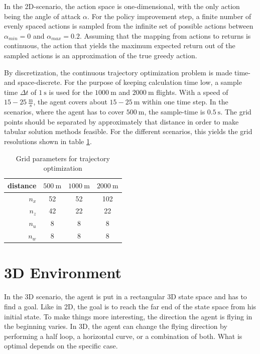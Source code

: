In the 2D-scenario, the action space is one-dimensional, with the only action being the angle of attack $\alpha$. For the policy improvement step, a finite number of evenly spaced actions is sampled from the infinite set of possible actions between $\alpha_{min} = 0$ and $\alpha_{max}=0.2$. Assuming that the mapping from actions to returns is continuous, the action that yields the maximum expected return out of the sampled actions is an approximation of the true greedy action.

By discretization, the continuous trajectory optimization problem is made time- and space-discrete. For the purpose of keeping calculation time low, a sample time $\Delta t$ of $1~\text{s}$ is used for the $1000~\text{m}$ and $2000~\text{m}$ flights. With a speed of $15-25 ~\frac{\text{m}}{\text{s}}$, the agent covers about $15-25~\text{m}$ within one time step. In the scenarios, where the agent has to cover $500~\text{m}$, the sample-time is $0.5~\text{s}$. The grid points should be separated by approximately that distance in order to make tabular solution methods feasible. For the different scenarios, this yields the grid resolutions shown in table \ref{tab:grids}.
\begin{table}
	\begin{center}
		\begin{tabular}{r|c c c}
			distance & $500~\text{m}$ & $1000~\text{m}$ & $2000~\text{m}$ \\ \hline
			$n_x$ & 52 & 52 & 102 \\
			$n_z$ & 42 & 22 & 22\\
			$n_u$ & 8 & 8 & 8 \\
			$n_w$ & 8 & 8 & 8
		\end{tabular}
	\end{center}
	\caption{Grid parameters for trajectory optimization}
	\label{tab:grids}
\end{table}

\section{3D Environment}

In the 3D scenario, the agent is put in a rectangular 3D state space and has to find a goal. Like in 2D, the goal is to reach the far end of the state space from his initial state. To make things more interesting, the direction the agent is flying in the beginning varies. In 3D, the agent can change the flying direction by performing a half loop, a horizontal curve, or a combination of both. What is optimal depends on the specific case.

